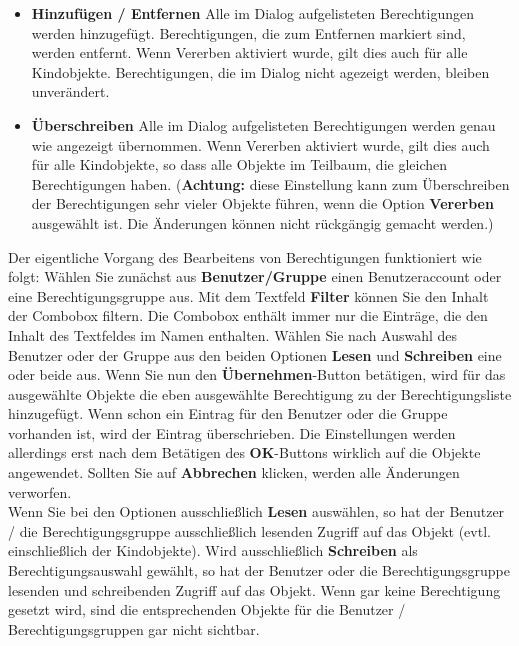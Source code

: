 \documentclass[a4paper,10pt]{book}
\begin{document}
\begin{itemize}
 \item \textbf{Hinzufügen / Entfernen}
    \subitem Alle im Dialog aufgelisteten Berechtigungen werden hinzugefügt. Berechtigungen, die zum Entfernen markiert sind, werden entfernt. Wenn Vererben aktiviert wurde, gilt dies auch für alle Kindobjekte. Berechtigungen, die im Dialog nicht agezeigt werden, bleiben unverändert.
 \item \textbf{Überschreiben}
    \subitem Alle im Dialog aufgelisteten Berechtigungen werden genau wie angezeigt übernommen.  Wenn Vererben aktiviert wurde, gilt dies auch für alle Kindobjekte, so dass alle Objekte im Teilbaum, die gleichen Berechtigungen haben. (\textbf{Achtung:} diese Einstellung kann zum Überschreiben der Berechtigungen sehr vieler Objekte führen, wenn die Option \textbf{Vererben} ausgewählt ist. Die Änderungen können nicht rückgängig gemacht werden.)
\end{itemize}
Der eigentliche Vorgang des Bearbeitens von Berechtigungen funktioniert wie folgt: Wählen Sie zunächst aus \textbf{Benutzer/Gruppe} einen
Benutzeraccount oder eine Berechtigungsgruppe aus. Mit dem Textfeld \textbf{Filter} können Sie den Inhalt der Combobox filtern. Die Combobox enthält immer nur die Einträge, die den Inhalt des Textfeldes im Namen enthalten. Wählen Sie nach Auswahl des Benutzer oder der Gruppe aus den beiden Optionen \textbf{Lesen} und \textbf{Schreiben} eine oder beide aus. Wenn Sie nun den \textbf{Übernehmen}-Button betätigen, wird für das ausgewählte Objekte die eben ausgewählte Berechtigung
zu der Berechtigungsliste hinzugefügt. Wenn schon ein Eintrag für den Benutzer oder die Gruppe vorhanden ist, wird der Eintrag überschrieben. Die Einstellungen werden allerdings erst nach dem Betätigen des \textbf{OK}-Buttons wirklich auf die Objekte
angewendet. Sollten Sie auf \textbf{Abbrechen} klicken, werden alle Änderungen verworfen.
\newline\\
Wenn Sie bei den Optionen ausschließlich \textbf{Lesen} auswählen, so hat der Benutzer / die Berechtigungsgruppe ausschließlich lesenden Zugriff auf das Objekt (evtl. einschließlich der Kindobjekte). Wird ausschließlich \textbf{Schreiben} als Berechtigungsauswahl gewählt, so hat der Benutzer oder die Berechtigungsgruppe lesenden und schreibenden Zugriff auf das Objekt.
Wenn gar keine Berechtigung gesetzt wird, sind die entsprechenden Objekte für die Benutzer / Berechtigungsgruppen gar nicht sichtbar.
\newline\\
\end{document}
